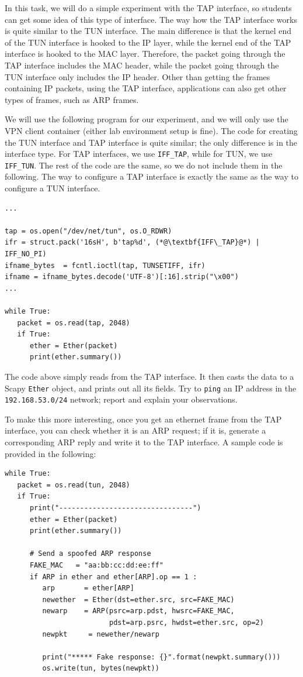 In this task, we will do a simple experiment with the TAP interface, so students
can get some idea of this type of interface. The way how the TAP interface works is 
quite similar to the TUN interface. The main difference is that the 
kernel end of the TUN interface is hooked to the IP layer, while the 
kernel end of the TAP interface is hooked to the MAC layer. 
Therefore, the packet going through the TAP interface includes the MAC header,
while the packet going through the TUN interface only includes the IP header. 
Other than getting the frames containing IP packets, using the TAP interface, 
applications can also get other types of frames, such as ARP frames. 


We will use the following program for our experiment, and we will
only use the VPN client container (either lab environment setup is fine).
The code 
for creating the TUN interface and TAP interface is quite similar; the 
only difference is in the interface type. For TAP interfaces, we use
\texttt{IFF\_TAP}, while for TUN,  we use \texttt{IFF\_TUN}.
The rest of the code are the same, so we do not include them in the 
following. The way to configure a TAP interface is exactly the same 
as the way to configure a TUN interface. 


\begin{lstlisting}
...

tap = os.open("/dev/net/tun", os.O_RDWR)
ifr = struct.pack('16sH', b'tap%d', (*@\textbf{IFF\_TAP}@*) | IFF_NO_PI)
ifname_bytes  = fcntl.ioctl(tap, TUNSETIFF, ifr)
ifname = ifname_bytes.decode('UTF-8')[:16].strip("\x00")
... 

while True:
   packet = os.read(tap, 2048)
   if True:
      ether = Ether(packet)
      print(ether.summary())
\end{lstlisting}
 
The code above simply reads from the TAP interface. It then casts 
the data to a Scapy \texttt{Ether} object, and prints out all 
its fields. Try to \texttt{ping} an IP address in
the \texttt{192.168.53.0/24} network; report and explain your observations.  

To make this more interesting, once you get an ethernet frame from the TAP interface,
you can check whether it is an ARP request; if it is, generate a corresponding
ARP reply and write it to the TAP interface. A sample code is provided in the
following:

\begin{lstlisting}
while True:
   packet = os.read(tun, 2048)
   if True:
      print("--------------------------------")
      ether = Ether(packet)
      print(ether.summary())

      # Send a spoofed ARP response
      FAKE_MAC   = "aa:bb:cc:dd:ee:ff"
      if ARP in ether and ether[ARP].op == 1 :
         arp       = ether[ARP]
         newether  = Ether(dst=ether.src, src=FAKE_MAC)
         newarp    = ARP(psrc=arp.pdst, hwsrc=FAKE_MAC,
                         pdst=arp.psrc, hwdst=ether.src, op=2)
         newpkt     = newether/newarp

         print("***** Fake response: {}".format(newpkt.summary()))
         os.write(tun, bytes(newpkt))
\end{lstlisting}

